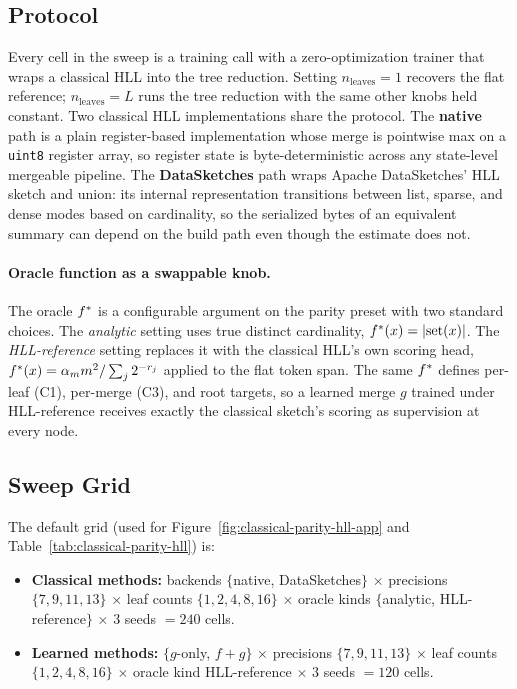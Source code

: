 \subsection{Protocol}

Every cell in the sweep is a training call with a zero-optimization
trainer that wraps a classical HLL into the tree reduction. Setting
$n_{\mathrm{leaves}} = 1$ recovers the flat reference;
$n_{\mathrm{leaves}} = L$ runs the tree reduction with the same
other knobs held constant. Two classical HLL implementations share
the protocol. The \textbf{native} path is a plain register-based
implementation whose merge is pointwise max on a \texttt{uint8}
register array, so register state is byte-deterministic across any
state-level mergeable pipeline. The \textbf{DataSketches} path wraps
Apache DataSketches' HLL sketch and union: its internal representation
transitions between list, sparse, and dense modes based on cardinality,
so the serialized bytes of an equivalent summary can depend on the
build path even though the estimate does not.

\paragraph{Oracle function as a swappable knob.}
The oracle $f^\ast$ is a configurable argument on the parity preset
with two standard choices. The \emph{analytic} setting uses true
distinct cardinality, $f^\ast(x) = |\mathrm{set}(x)|$. The
\emph{HLL-reference} setting replaces it with the classical HLL's own
scoring head, $f^\ast(x) = \alpha_m m^2 / \sum_j 2^{-r_j}$ applied to
the flat token span. The same $f^\ast$ defines per-leaf (C1),
per-merge (C3), and root targets, so a learned merge $g$ trained under
HLL-reference receives exactly the classical sketch's scoring as
supervision at every node.

\subsection{Sweep Grid}

The default grid (used for Figure~\ref{fig:classical-parity-hll-app} and
Table~\ref{tab:classical-parity-hll}) is:

\begin{itemize}
\item \textbf{Classical methods:} backends $\{$native, DataSketches$\}$ $\times$ precisions $\{7, 9, 11, 13\}$ $\times$ leaf counts $\{1, 2, 4, 8, 16\}$ $\times$ oracle kinds $\{$analytic, HLL-reference$\}$ $\times$ $3$ seeds $= 240$ cells.
\item \textbf{Learned methods:} $\{g$-only, $f{+}g\}$ $\times$ precisions $\{7, 9, 11, 13\}$ $\times$ leaf counts $\{1, 2, 4, 8, 16\}$ $\times$ oracle kind HLL-reference $\times$ $3$ seeds $= 120$ cells.
\end{itemize}

